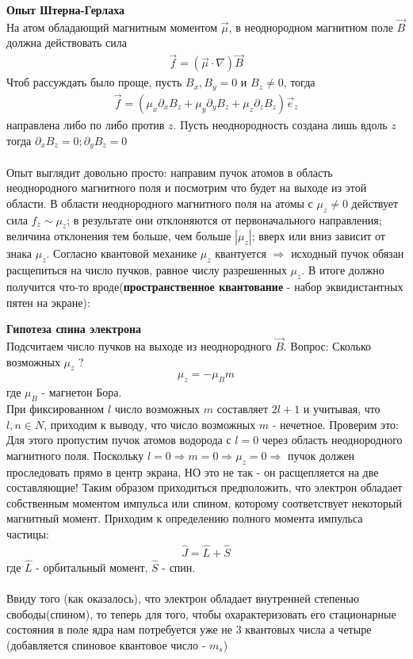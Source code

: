 \documentclass[__main__.tex]{subfiles}
\begin{document}
\textbf{Опыт Штерна-Герлаха}\\
На атом обладающий магнитным моментом $\vec{\mu}$, в неоднородном магнитном поле $\vec{B}$ должна действовать сила
\begin{gather*}
    \vec{f} = \left(\vec{\mu}\cdot\nabla\right)\vec{B}
\end{gather*}
Чтоб рассуждать было проще, пусть $B_x, B_y = 0$  и $B_z \neq 0$, тогда
\begin{gather*}
    \vec{f} = \left(\mu_x\partial_xB_z+\mu_y\partial_yB_z+\mu_z\partial_zB_z\right)\vec{e}_z
\end{gather*}
направлена либо по либо против $z$. Пусть неоднородность создана лишь вдоль $z$ тогда $\partial_xB_z=0; \partial_yB_z=0$\\\\
Опыт выглядит довольно просто: направим пучок атомов в область неоднородного магнитного поля и посмотрим что будет на выходе из этой области.
В области неоднородного магнитного поля на атомы с $\mu_z \neq 0$ действует сила $f_z \sim \mu_z$; в результате они отклоняются от первоначального направления; величина отклонения тем больше, чем больше $|\mu_z|$; вверх или вниз зависит от знака $\mu_z$.
Согласно квантовой механике $\mu_z$ квантуется $\Rightarrow$ исходный пучок обязан расщепиться на число пучков, равное числу разрешенных $\mu_z$. В итоге должно получится что-то вроде(\textbf{пространственное квантование} - набор эквидистантных пятен на экране):
\newpage
\begin{figure}[h]
    \center{\texttt{[image: ch-18]}}
\end{figure}

\textbf{Гипотеза спина электрона}\\
Подсчитаем число пучков на выходе из неоднородного $\vec{B}$. Вопрос: Сколько возможных $\mu_z$ ?
\begin{gather*}
    \mu_z = -\mu_Bm
\end{gather*}
где $\mu_B$ - магнетон Бора.\\
При фиксированном $l$ число возможных $m$ составляет $2l+1$ и учитывая, что $l,n \in N$, приходим к выводу, что число возможных $m$ - нечетное. Проверим это:\\
Для этого пропустим пучок атомов водорода с $l=0$ через область неоднородного магнитного поля. Поскольку $l = 0 \Rightarrow m = 0 \Rightarrow \mu_z = 0 \Rightarrow$ пучок должен проследовать прямо в центр экрана, НО это не так - он расщепляется на две составляющие! Таким образом приходиться предположить, что электрон обладает собственным моментом импульса или спином, которому соответствует некоторый магнитный момент. Приходим к определению полного момента импульса частицы:
\begin{gather*}
    \hat{J} = \hat{L}+\hat{S}
\end{gather*}
где $\hat{L}$ - орбитальный момент, $\hat{S}$ - спин.\\\\
Ввиду того (как оказалось), что электрон обладает внутренней степенью свободы(спином), то теперь для того, чтобы охарактеризовать его стационарные состояния в поле ядра нам потребуется уже не 3 квантовых числа а четыре (добавляется спиновое квантовое число - $m_s$)
\end{document}
